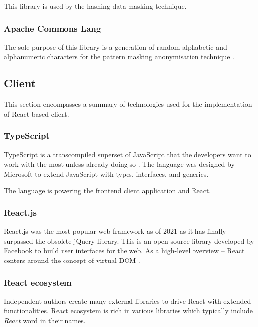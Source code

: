 \documentclass[a4paper,twoside,12pt]{book}
\begin{document}
This library is used by the hashing data masking technique.

\subsubsection{Apache Commons Lang}

The sole purpose of this library is a generation of random alphabetic and alphanumeric characters for the pattern masking anonymisation technique \cite{bib:apache_commons_lang}.

\subsection{Client}

This section encompasses a summary of technologies used for the implementation of React-based client.

\subsubsection{TypeScript}

TypeScript is a transcompiled superset of JavaScript that the developers want to work with the most unless already doing so \cite{bib:stackoverflow2021}. The language was designed by Microsoft to extend JavaScript with types, interfaces, and generics.

The language is powering the frontend client application and React.

\subsubsection{React.js}

React.js was the most popular web framework as of 2021 \cite{bib:stackoverflow2021} as it has finally surpassed the obsolete jQuery library. This is an open-source library developed by Facebook to build user interfaces for the web. As a high-level overview – React centers around the concept of virtual DOM \cite{bib:modern_fullstack}.

\subsubsection{React ecosystem}

Independent authors create many external libraries to drive React with extended functionalities. React ecosystem is rich in various libraries which typically include \textit{React} word in their names.
\end{document}
